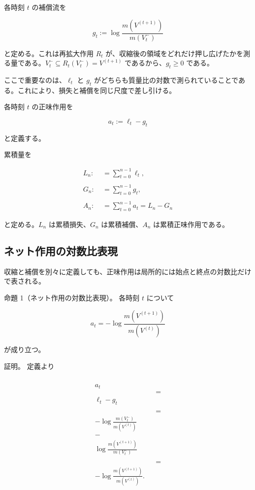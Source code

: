 \documentclass[12pt,a4paper]{article}
\begin{document}
各時刻 \(t\) の補償流を

\[
g_{t} := \log \frac{m(V^{(t+1)})}{m(V_{t}^-)}
\]

と定める。これは再拡大作用 \(R_{t}\) が、収縮後の領域をどれだけ押し広げたかを測る量である。\(V_{t}^- \subseteq R_{t}(V_{t}^-)=V^{(t+1)}\) であるから、\(g_{t}\ge 0\) である。

ここで重要なのは、\(\ell_{t}\) と \(g_{t}\) がどちらも質量比の対数で測られていることである。これにより、損失と補償を同じ尺度で差し引ける。

\begin{definition}[正味作用]
各時刻 $t$ の正味作用を

$$
a_{t} := \ell_{t} - g_{t}
$$

と定義する。
\end{definition}

累積量を

\[
\begin{aligned}
L_{n} :&= \sum_{t=0}^{n-1} \ell_{t}, \\
\qquad \\
G_{n} :&= \sum_{t=0}^{n-1} g_{t}, \\
\qquad \\
A_{n} :&= \sum_{t=0}^{n-1} a_{t} = L_{n} - G_{n}
\end{aligned}
\]

と定める。\(L_{n}\) は累積損失、\(G_{n}\) は累積補償、\(A_{n}\) は累積正味作用である。

\subsection{ネット作用の対数比表現}\label{ux30cdux30c3ux30c8ux4f5cux7528ux306eux5bfeux6570ux6bd4ux8868ux73fe}

収縮と補償を別々に定義しても、正味作用は局所的には始点と終点の対数比だけで表される。

命題 1（ネット作用の対数比表現）。 各時刻 \(t\) について

\[
a_{t} = -\log \frac{m(V^{(t+1)})}{m(V^{(t)})}
\]

が成り立つ。

証明。 定義より

\[
\begin{aligned}
\begin{aligned} \\
a_{t} \\
&&= \\
\ell_{t} - g_{t} \\ \\
&&= \\
-\log \frac{m(V_{t}^-)}{m(V^{(t)})} \\
- \\
\log \frac{m(V^{(t+1)})}{m(V_{t}^-)} \\ \\
&&= \\
-\log \frac{m(V^{(t+1)})}{m(V^{(t)})}. \\
\end{aligned}
\end{aligned}
\]
\end{document}
